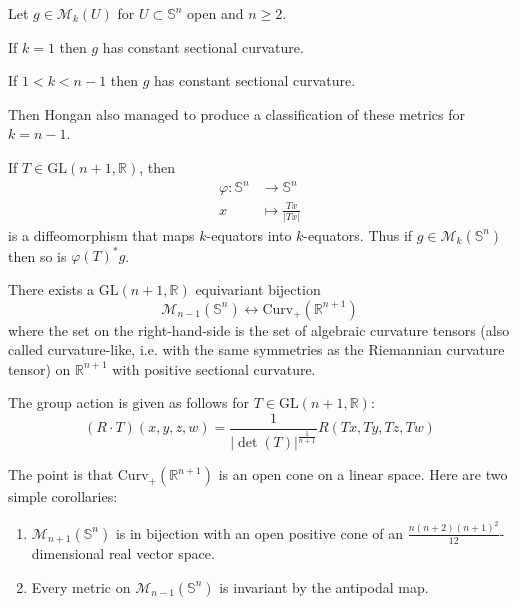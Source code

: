 \medskip\noindent

Let $g\in\mathcal{M}_k(U)$ for $U\subset\mathbb{S}^n$ open and $n\geq 2$.

\begin{theorem}
\label{theorem-Beltrami-Schafli}
If $k=1$ then $g$ has constant sectional curvature.
\end{theorem}

\begin{theorem}[Hongan]
\label{theorem-Hongan}
If $1<k<n-1$ then $g$ has constant sectional curvature.
\end{theorem}

Then Hongan also managed to produce a classification of these metrics for
$k=n-1$.

\begin{remark}
\label{remark-linear-invertible-preserving-equators-is-in-Mg}
If $T\in \text{GL}(n+1,\mathbb{R})$, then
\begin{align*}
\varphi: \mathbb{S}^n &\longrightarrow \mathbb{S}^n \\
x &\longmapsto \frac{Tx}{|Tx|}
\end{align*}
is a diffeomorphism that maps $k$-equators into $k$-equators. Thus if
$g\in\mathcal{M}_k(\mathbb{S}^n)$ then so is $\varphi(T)^*g$.
\end{remark}

\begin{theorem}
\label{theorem-equivariant-bijection}
There exists a $\text{GL}(n+1,\mathbb{R})$ equivariant bijection
$$
\mathcal{M}_{n-1}(\mathbb{S}^n)\leftrightarrow \text{Curv}_+(\mathbb{R}^{n+1})
$$
where the set on the right-hand-side is the set of algebraic curvature tensors
(also called curvature-like, i.e. with the same symmetries as the Riemannian
curvature tensor) on $\mathbb{R}^{n+1}$ with positive sectional curvature.

The group action is given as follows for $T\in\text{GL}(n+1,\mathbb{R})$:
$$
(R\cdot T)(x,y,z,w)=\frac{1}{|\det(T)|^{\frac{1}{n+1}}}R(Tx,Ty,Tz,Tw)
$$
\end{theorem}

The point is that $\text{Curv}_+(\mathbb{R}^{n+1})$ is an open cone on a linear
space. Here are two simple corollaries:

\begin{lemma}
\label{lemma-corollaries}
\begin{enumerate}
\item $\mathcal{M}_{n+1}(\mathbb{S}^n)$ is in bijection with an open positive
cone of an $\frac{n(n+2)(n+1)^2}{12}$-dimensional real vector space.
\item Every metric on $\mathcal{M}_{n-1}(\mathbb{S}^n)$ is invariant by the
antipodal map.
\end{enumerate}
\end{lemma}

